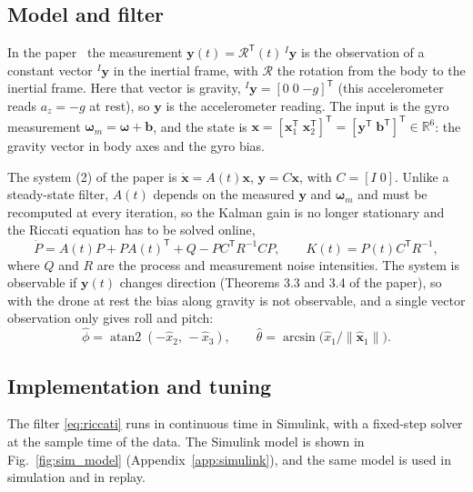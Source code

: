 \documentclass[11pt,a4paper]{article}
\newcommand{\vect}[1]{\boldsymbol{#1}}
\begin{document}
\setcounter{section}{5}   %
\subsection{Model and filter}
\label{sec:model}

In the paper~\cite{batista2011} the measurement $\vect{y}(t)=\mathcal{R}^{\mathsf T}(t)\,{}^{I}\vect{y}$ is the observation of a constant vector ${}^{I}\vect{y}$ in the inertial frame, with $\mathcal{R}$ the rotation from the body to the inertial frame.
Here that vector is gravity, ${}^{I}\vect{y}=[0\;0\;{-g}]^{\mathsf T}$ (this accelerometer reads $a_z=-g$ at rest), so $\vect{y}$ is the accelerometer reading.
The input is the gyro measurement $\vect{\omega}_m=\vect{\omega}+\vect{b}$, and the state is $\vect{x}=[\vect{x}_1^{\mathsf T}\;\vect{x}_2^{\mathsf T}]^{\mathsf T}=[\vect{y}^{\mathsf T}\;\vect{b}^{\mathsf T}]^{\mathsf T}\in\mathbb{R}^6$: the gravity vector in body axes and the gyro bias.

The system (2) of the paper is $\dot{\vect{x}}=A(t)\vect{x}$, $\vect{y}=C\vect{x}$, with $C=[I\;0]$.
Unlike a steady-state filter, $A(t)$ depends on the measured $\vect{y}$ and $\vect{\omega}_m$ and must be recomputed at every iteration, so the Kalman gain is no longer stationary and the Riccati equation has to be solved online,
\begin{equation}
\dot P = A(t)P + PA(t)^{\mathsf T} + Q - PC^{\mathsf T}R^{-1}CP, \qquad K(t) = P(t)C^{\mathsf T}R^{-1},
\label{eq:riccati}
\end{equation}
where $Q$ and $R$ are the process and measurement noise intensities.
The system is observable if $\vect{y}(t)$ changes direction (Theorems 3.3 and 3.4 of the paper), so with the drone at rest the bias along gravity is not observable, and a single vector observation only gives roll and pitch:
\begin{equation}
\hat\phi = \operatorname{atan2}(-\hat x_2,\,-\hat x_3), \qquad
\hat\theta = \arcsin\!\big(\hat x_1 / \|\hat{\vect{x}}_1\|\big).
\label{eq:angles}
\end{equation}

\subsection{Implementation and tuning}
\label{sec:impl}

The filter \eqref{eq:riccati} runs in continuous time in Simulink, with a fixed-step solver at the sample time of the data.
The Simulink model is shown in Fig.~\ref{fig:sim_model} (Appendix~\ref{app:simulink}), and the same model is used in simulation and in replay.
\end{document}
